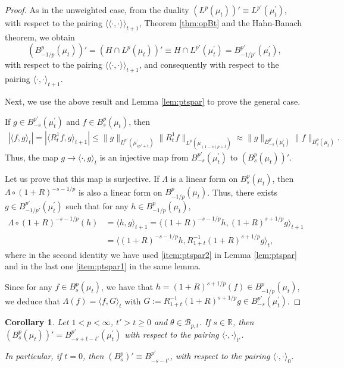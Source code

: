 \documentclass[12pt,twoside,leqno,final]{amsart}
\theoremstyle{plain}
\newtheorem{cor}[thm]{Corollary}
\begin{document}
\begin{proof}
As in the unweighted case, from the duality 
$(L^p(\mu_t))'\equiv L^{p'}(\mu_t^{\prime})$, 
with respect to the pairing $\langle\langle\cdot,\cdot\rangle\rangle_{t+1}$, Theorem \ref{thm:opBt} 
and the Hahn-Banach theorem, we obtain  
$$
\left(B^p_{-1/p}(\mu_t)\right)'=(H\cap L^p(\mu_t))'\equiv H\cap L^{p'}(\mu_t^{\prime})= B^{p'}_{-1/p'}(\mu^\prime_t),
$$
with respect to the pairing $\langle\langle\cdot,\cdot\rangle\rangle_{t+1}$, and consequently with respect to 
the pairing $\langle\cdot,\cdot\rangle_{t+1}$.

Next, we use the above result and Lemma \ref{lem:ptspar} to prove the general case.

If $g\in B^{p'}_{-s}(\mu_t^\prime)$ and $f\in B^{p}_{s}(\mu_t)$, then 
\begin{align*}
|\langle f,g\rangle_t|=|\langle R^1_t f,g\rangle_{t+1}|
\le \|g\|_{L^{p'}(\mu^\prime_{sp'+t})}\|R^1_t f\|_{L^p(\mu_{(1-s)p+t})}
\approx \|g\|_{B^{p'}_{-s}(\mu_t^\prime)}\|f\|_{B^p_s(\mu_t)}.
\end{align*}
Thus, the map $g\to \langle \cdot,g\rangle_t$ is an injective map from $B^{p'}_{-s}(\mu_t^\prime)$ to   $\left(B^p_s(\mu_t)\right)'$.

Let us prove that this map is surjective. 
If $\Lambda$ is a linear form on $B^p_s(\mu_t)$, then $\Lambda\circ (1+R)^{-s-1/p}$ is also a linear form on $B^p_{-1/p}(\mu_t)$. 
Thus, there exists $g\in B^{p'}_{-1/p'}(\mu^\prime_t)$ such that for any $h\in B^p_{-1/p}(\mu_t)$, 
\begin{align*}
\Lambda\circ (1+R)^{-s-1/p}(h)&=\langle h,g\rangle_{t+1}
=\langle (1+R)^{-s-1/p}h, (1+R)^{s+1/p}g\rangle_{t+1}\\
&=\langle (1+R)^{-s-1/p}h, R^{-1}_{1+t}(1+R)^{s+1/p}g\rangle_{t},
\end{align*}
where in the second identity we have used \eqref{item:ptspar2} in Lemma \ref{lem:ptspar} and in the last one \eqref{item:ptspar1} in the same lemma.

Since for any $f\in B^p_s(\mu_t)$, we have that $h=(1+R)^{s+1/p}(f)\in B^p_{-1/p}(\mu_t)$, 
we deduce that 
$\Lambda (f)=\langle f,G\rangle_t$ with $G:=R^{-1}_{1+t}(1+R)^{s+1/p}g\in B^{p'}_{-s}(\mu^\prime_t)$. 
\end{proof}

\begin{cor}\label{cor:dualB}
Let $1<p<\infty$, $t'>t\ge 0$ and $\theta\in {{\mathcal B}}_{p,t}$. 
If $s\in{{\mathbb R}}$, then $\left(B^p_{s}(\mu_t)\right)'=B^{p'}_{-s+t-t'}(\mu^\prime_t)$ 
with respect to the pairing $\langle \cdot,\cdot\rangle_{t'}$.

In particular, if $t=0$, then $(B^p_s)' \equiv B^{p'}_{-s-t'}$, with respect to the pairing $\langle \cdot,\cdot\rangle_{0}$.
\end{cor}
\end{document}
